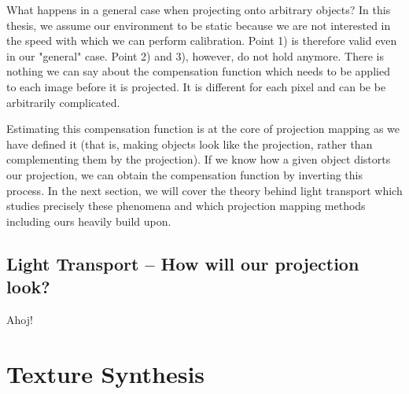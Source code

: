 What happens in a general case when projecting onto arbitrary objects? In this thesis, we assume our environment to be static because we are not interested in the speed with which we can perform calibration. Point 1) is therefore valid even in our "general" case. Point 2) and 3), however, do not hold anymore. There is nothing we can say about the compensation function which needs to be applied to each image before it is projected. It is different for each pixel and can be be arbitrarily complicated.

Estimating this compensation function is at the core of projection mapping as we have defined it (that is, making objects look like the projection, rather than complementing them by the projection). If we know how a given object distorts our projection, we can obtain the compensation function by inverting this process. In the next section, we will cover the theory behind light transport which studies precisely these phenomena and which projection mapping methods including ours heavily build upon.

\subsection{Light Transport -- How will our projection look?}
\label{section:background-projection_mapping-light_transport}

Ahoj!

\section{Texture Synthesis}
\label{section:background-texture_synthesis}

